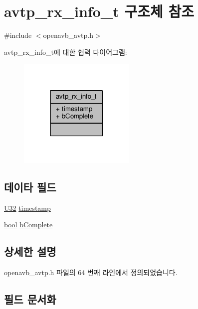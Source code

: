 \hypertarget{structavtp__rx__info__t}{}\section{avtp\+\_\+rx\+\_\+info\+\_\+t 구조체 참조}
\label{structavtp__rx__info__t}


{\ttfamily \#include $<$openavb\+\_\+avtp.\+h$>$}



avtp\+\_\+rx\+\_\+info\+\_\+t에 대한 협력 다이어그램\+:
\nopagebreak
\begin{figure}[H]
\begin{center}
\leavevmode
\includegraphics[width=158pt]{structavtp__rx__info__t__coll__graph}
\end{center}
\end{figure}
\subsection*{데이타 필드}
\begin{DoxyCompactItemize}
\item 
\hyperlink{openavb__types__base__pub_8h_a696390429f2f3b644bde8d0322a24124}{U32} \hyperlink{structavtp__rx__info__t_a789796b7042ad0c179aca7d160c8def8}{timestamp}
\item 
\hyperlink{avb__gptp_8h_af6a258d8f3ee5206d682d799316314b1}{bool} \hyperlink{structavtp__rx__info__t_aa9bc14397eb72e06780631cb2027d7ad}{b\+Complete}
\end{DoxyCompactItemize}


\subsection{상세한 설명}


openavb\+\_\+avtp.\+h 파일의 64 번째 라인에서 정의되었습니다.



\subsection{필드 문서화}
